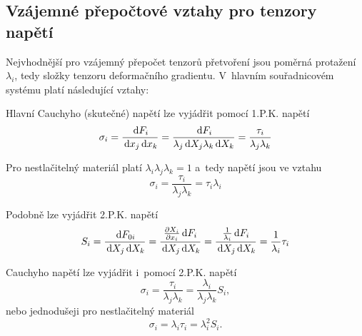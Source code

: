 
\subsection{Vzájemné přepočtové vztahy pro tenzory napětí}
Nejvhodnější pro vzájemný přepočet tenzorů přetvoření jsou poměrná protažení $\lambda_i$, tedy složky tenzoru deformačního gradientu. V~hlavním souřadnicovém systému platí následující vztahy:

Hlavní Cauchyho (skutečné) napětí lze vyjádřit pomocí 1.P.K. napětí
\begin{equation}
	\sigma_i = \frac{\,\mathrm{d} F_i}{\,\mathrm{d} x_j \,\mathrm{d} x_k}
	= \frac{\,\mathrm{d} F_i}{\lambda_j \,\mathrm{d} X_j \lambda_k \,\mathrm{d} X_k}
	= \frac{\tau_i}{\lambda_j \lambda_k}
\end{equation}

Pro nestlačitelný materiál platí $\lambda_i\lambda_j\lambda_k=1$ a~tedy napětí jsou ve vztahu
\begin{equation}
	\sigma_i = \frac{\tau_i}{\lambda_j \lambda_k} = \tau_i \lambda_i
\end{equation}

Podobně lze vyjádřit 2.P.K. napětí
\begin{equation}
	S_i = \frac{\,\mathrm{d} F_{0i}}{\,\mathrm{d} X_j \,\mathrm{d} X_k}
	= \frac{\frac{\partial X_i}{\partial x_i} \,\mathrm{d} F_i}{\,\mathrm{d} X_j \,\mathrm{d} X_k}
	= \frac{\frac{1}{\lambda_i} \,\mathrm{d} F_i}{\,\mathrm{d} X_j \,\mathrm{d} X_k}
	= \frac{1}{\lambda_i} \tau_i
\end{equation}

Cauchyho napětí lze vyjádřit i~pomocí 2.P.K. napětí
\begin{equation}
	\sigma_i = \frac{\tau_i}{\lambda_j \lambda_k}
	= \frac{\lambda_i}{\lambda_j \lambda_k} S_i,
\end{equation}
nebo jednodušeji pro nestlačitelný materiál
\begin{equation}
	\sigma_i = \lambda_i \tau_i = \lambda_i^2 S_i.
\end{equation}
